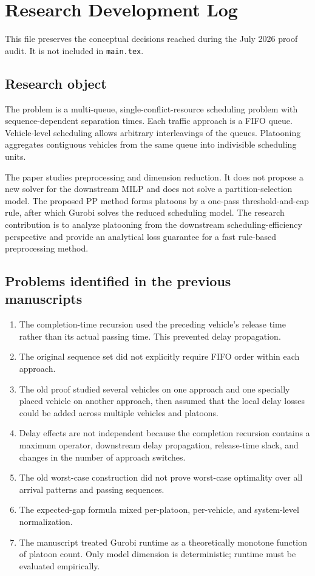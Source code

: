 \section*{Research Development Log}

This file preserves the conceptual decisions reached during the July 2026 proof audit. It is not included in \texttt{main.tex}.

\subsection*{Research object}

The problem is a multi-queue, single-conflict-resource scheduling problem with sequence-dependent separation times. Each traffic approach is a FIFO queue. Vehicle-level scheduling allows arbitrary interleavings of the queues. Platooning aggregates contiguous vehicles from the same queue into indivisible scheduling units.

The paper studies preprocessing and dimension reduction. It does not propose a new solver for the downstream MILP and does not solve a partition-selection model. The proposed PP method forms platoons by a one-pass threshold-and-cap rule, after which Gurobi solves the reduced scheduling model. The research contribution is to analyze platooning from the downstream scheduling-efficiency perspective and provide an analytical loss guarantee for a fast rule-based preprocessing method.

\subsection*{Problems identified in the previous manuscripts}

\begin{enumerate}
  \item The completion-time recursion used the preceding vehicle's release time rather than its actual passing time. This prevented delay propagation.
  \item The original sequence set did not explicitly require FIFO order within each approach.
  \item The old proof studied several vehicles on one approach and one specially placed vehicle on another approach, then assumed that the local delay losses could be added across multiple vehicles and platoons.
  \item Delay effects are not independent because the completion recursion contains a maximum operator, downstream delay propagation, release-time slack, and changes in the number of approach switches.
  \item The old worst-case construction did not prove worst-case optimality over all arrival patterns and passing sequences.
  \item The expected-gap formula mixed per-platoon, per-vehicle, and system-level normalization.
  \item The manuscript treated Gurobi runtime as a theoretically monotone function of platoon count. Only model dimension is deterministic; runtime must be evaluated empirically.
\end{enumerate}

